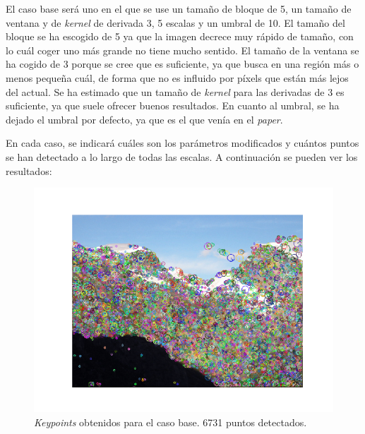 \documentclass[11pt,a4paper]{article}
\begin{document}
El caso base será uno en el que se use un tamaño de bloque de 5, un tamaño de ventana
y de \textit{kernel} de derivada 3, 5 escalas y un umbral de 10. El tamaño del bloque se ha escogido
de 5 ya que la imagen decrece muy rápido de tamaño, con lo cuál coger uno más grande no tiene mucho
sentido. El tamaño de la ventana se ha cogido de 3 porque se cree que es suficiente, ya que busca
en una región más o menos pequeña cuál, de forma que no es influido por píxels que están
más lejos del actual. Se ha estimado que un tamaño de \textit{kernel} para las derivadas
de 3 es suficiente, ya que suele ofrecer buenos resultados. En cuanto al umbral, se ha dejado
el umbral por defecto, ya que es el que venía en el \textit{paper}. 

En cada caso, se indicará cuáles son los parámetros modificados y cuántos puntos se
han detectado a lo largo de todas las escalas. A continuación se pueden ver los resultados:

\begin{figure}[H]
	\centering
	\includegraphics[scale=0.6]{img/kp-base}
	\caption{\textit{Keypoints} obtenidos para el caso base. 6731 puntos detectados.}
	\label{fig:kp-base}
\end{figure}
\end{document}
